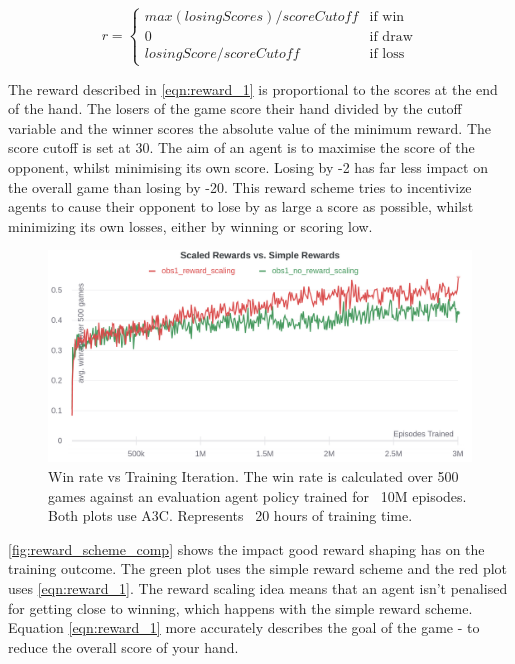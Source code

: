 \documentclass[../main.tex]{subfiles}
\begin{document}
\begin{equation}
r = \begin{cases}
    max(losingScores) / scoreCutoff & \text{if win} \\
                                   0 & \text{if draw} \\
    losingScore / scoreCutoff   & \text{if loss}
    \end{cases}
\label{eqn:reward_1}
\end{equation}

The reward described in \eqref{eqn:reward_1} is proportional to the scores at the end of the hand. The losers of the game score their hand divided by the cutoff variable and the winner scores the absolute value of the minimum reward. The score cutoff is set at 30. The aim of an agent is to maximise the score of the opponent, whilst minimising its own score. Losing by -2 has far less impact on the overall game than losing by -20. This reward scheme tries to incentivize agents to cause their opponent to lose by as large a score as possible, whilst minimizing its own losses, either by winning or scoring low.

\begin{figure}
    \centering
    \includegraphics[width=\textwidth,keepaspectratio]{images/method/obs1_reward_scaling_comp.png}
    \caption{Win rate vs Training Iteration. The win rate is calculated over 500 games against an evaluation agent policy trained for ~10M episodes. Both plots use A3C. Represents ~20 hours of training time.}
    \label{fig:reward_scheme_comp}
\end{figure}

\autoref{fig:reward_scheme_comp} shows the impact good reward shaping has on the training outcome. The green plot uses the simple reward scheme and the red plot uses \eqref{eqn:reward_1}. The reward scaling idea means that an agent isn't penalised for getting close to winning, which happens with the simple reward scheme. Equation \eqref{eqn:reward_1} more accurately describes the goal of the game - to reduce the overall score of your hand. 
\end{document}
